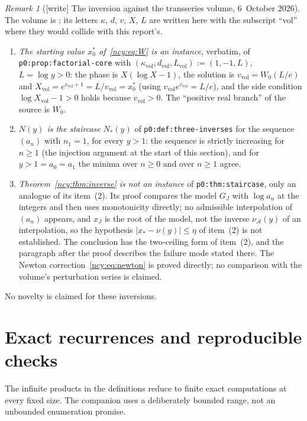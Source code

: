 \documentclass[11pt,letterpaper]{article}
\numberwithin{equation}{section}
\theoremstyle{remark}\newtheorem{remark}[theorem]{Remark}
\newcommand{\file}[1]{\nolinkurl{#1}}
\theoremstyle{definition}\newtheorem{definition}[theorem]{Definition}\theoremstyle{plain}
\begin{document}
\begin{remark}[{[write]} The inversion against the transseries volume, 6~October 2026]\label{ncy:rem:transseries}
The volume is
;
its letters $\kappa$, $d$, $v$, $X$, $L$ are written here with the subscript
``vol'' where they would collide with this report's.
\begin{enumerate}
\item[(a)] \emph{The starting value $x_0^\ast$ of~\eqref{ncy:eq:W} is an
 instance}, verbatim, of \file{p0:prop:factorial-core} with
 $(\kappa_{\mathrm{vol}},d_{\mathrm{vol}},L_{\mathrm{vol}}):=(1,-1,L)$,
 $L=\log y>0$: the phase is $X(\log X-1)$, the solution is
 $v_{\mathrm{vol}}=W_0(L/e)$ and
 $X_{\mathrm{vol}}=e^{v_{\mathrm{vol}}+1}=L/v_{\mathrm{vol}}=x_0^\ast$ (using
 $v_{\mathrm{vol}}e^{v_{\mathrm{vol}}}=L/e$), and the side condition
 $\log X_{\mathrm{vol}}-1>0$ holds because $v_{\mathrm{vol}}>0$. The
 ``positive real branch'' of the source is $W_0$.
\item[(b)] \emph{$N(y)$ is the staircase} $N_\ast(y)$ of
 \file{p0:def:three-inverses} for the sequence $(a_n)$ with $n_1=1$, for
 every $y>1$: the sequence is strictly increasing for $n\ge1$ (the injection
 argument at the start of this section), and for $y>1=a_0=a_1$ the minima over
 $n\ge0$ and over $n\ge1$ agree.
\item[(c)] \emph{Theorem~\ref{ncy:thm:inverse} is not an instance} of
 \file{p0:thm:staircase}, only an analogue of its item~(2). Its proof compares
 the model $G_J$ with $\log a_n$ at the integers and then uses monotonicity
 directly; no admissible interpolation of $(a_n)$ appears, and $x_J$ is the
 root of the model, not the inverse $\nu_{\mathcal A}(y)$ of an
 interpolation, so the hypothesis $|x_\ast-\nu(y)|\le\eta$ of item~(2) is not
 established. The conclusion has the two-ceiling form of item~(2), and the
 paragraph after the proof describes the failure mode stated there.
 The Newton correction~\eqref{ncy:eq:newton} is proved directly; no
 comparison with the volume's perturbation series is claimed.
\end{enumerate}
No novelty is claimed for these inversions.
\end{remark}

\section{Exact recurrences and reproducible checks}\label{ncy:sec:computation}
The infinite products in the definitions reduce to finite exact
computations at every fixed size. The companion uses a deliberately
bounded range, not an unbounded enumeration promise.
\end{document}
